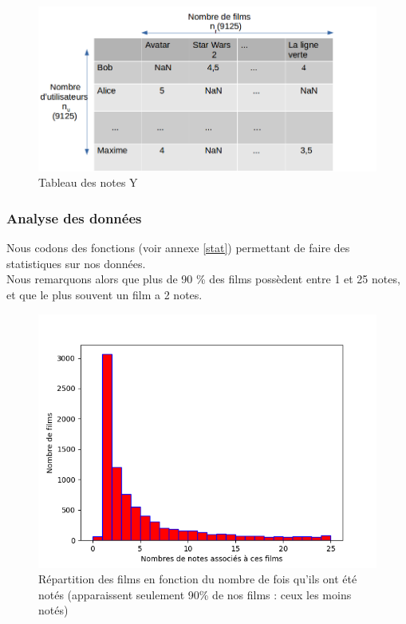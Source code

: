 \documentclass[a4paper,10pt]{article}
\begin{document}
\begin{figure}[H]
  \centering
  \includegraphics[scale=0.4]{Ynew.png}
  \caption{Tableau des notes Y}
\end{figure}

\subsubsection{Analyse des données}

Nous codons des fonctions (voir annexe \ref{stat}) permettant de faire des statistiques sur nos données.\\

Nous remarquons alors que plus de 90 \% des films possèdent entre 1 et 25 notes, et que le plus souvent un film a 2 notes.\\

\begin{figure}[H]
  \centering
\includegraphics[scale=0.5]{hist2.png}
\caption{Répartition des films en fonction du nombre de fois qu'ils ont été notés (apparaissent seulement 90\% de nos films : ceux les moins notés)}
\end{figure}
\end{document}
